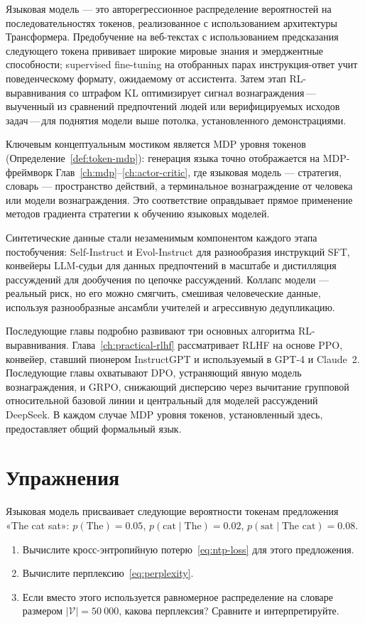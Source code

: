 Языковая модель --- это авторегрессионное распределение вероятностей на последовательностях токенов, реализованное с использованием архитектуры Трансформера. Предобучение на веб-текстах с использованием предсказания следующего токена прививает широкие мировые знания и эмерджентные способности; supervised fine-tuning на отобранных парах инструкция-ответ учит поведенческому формату, ожидаемому от ассистента. Затем этап RL-выравнивания со штрафом KL оптимизирует сигнал вознаграждения\,---\,выученный из сравнений предпочтений людей или верифицируемых исходов задач\,---\,для поднятия модели выше потолка, установленного демонстрациями.

Ключевым концептуальным мостиком является MDP уровня токенов (Определение~\ref{def:token-mdp}): генерация языка точно отображается на MDP-фреймворк Глав~\ref{ch:mdp}--\ref{ch:actor-critic}, где языковая модель --- стратегия, словарь --- пространство действий, а терминальное вознаграждение от человека или модели вознаграждения. Это соответствие оправдывает прямое применение методов градиента стратегии к обучению языковых моделей.

Синтетические данные стали незаменимым компонентом каждого этапа постобучения: Self-Instruct и Evol-Instruct для разнообразия инструкций SFT, конвейеры LLM-судьи для данных предпочтений в масштабе и дистилляция рассуждений для дообучения по цепочке рассуждений. Коллапс модели --- реальный риск, но его можно смягчить, смешивая человеческие данные, используя разнообразные ансамбли учителей и агрессивную дедупликацию.

Последующие главы подробно развивают три основных алгоритма RL-выравнивания. Глава~\ref{ch:practical-rlhf} рассматривает RLHF на основе PPO, конвейер, ставший пионером InstructGPT и используемый в GPT-4 и Claude~2. Последующие главы охватывают DPO, устраняющий явную модель вознаграждения, и GRPO, снижающий дисперсию через вычитание групповой относительной базовой линии и центральный для моделей рассуждений DeepSeek. В каждом случае MDP уровня токенов, установленный здесь, предоставляет общий формальный язык.

\section*{Упражнения}

\begin{exercise}
\label{ex:lm-perplexity}
Языковая модель присваивает следующие вероятности токенам предложения «The cat sat»: $p(\text{The}) = 0.05$, $p(\text{cat} \mid \text{The}) = 0.02$, $p(\text{sat} \mid \text{The cat}) = 0.08$.
\begin{enumerate}
  \item Вычислите кросс-энтропийную потерю~\eqref{eq:ntp-loss} для этого предложения.
  \item Вычислите перплексию~\eqref{eq:perplexity}.
  \item Если вместо этого используется равномерное распределение на словаре размером $|\mathcal{V}| = 50~000$, какова перплексия? Сравните и интерпретируйте.
\end{enumerate}
\end{exercise}

